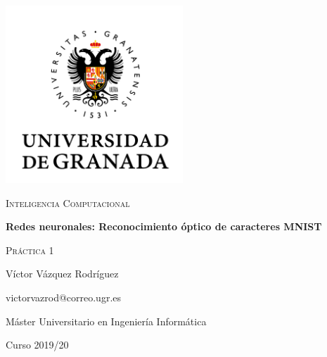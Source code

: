 \documentclass{article}
\begin{document}
\begin{titlepage}
    \centering
    \includegraphics[width=0.5\textwidth]{images/logo-ugr.png}\par
    \vspace{1cm}
    {\Large\scshape Inteligencia Computacional \par}
    {\huge\bfseries Redes neuronales: Reconocimiento óptico de caracteres MNIST
    \par}
    \vspace{0.2cm}
    {\scshape Práctica 1 \par}
    \vfill
    {\large Víctor Vázquez Rodríguez  \par}
    {victorvazrod@correo.ugr.es \par}
    \vfill
    {\large Máster Universitario en Ingeniería Informática \par}
    \vspace{0.2cm}
    {Curso 2019/20 \par}
\end{titlepage}

\tableofcontents\newpage

\newpage
\newpage
\newpage
\end{document}
